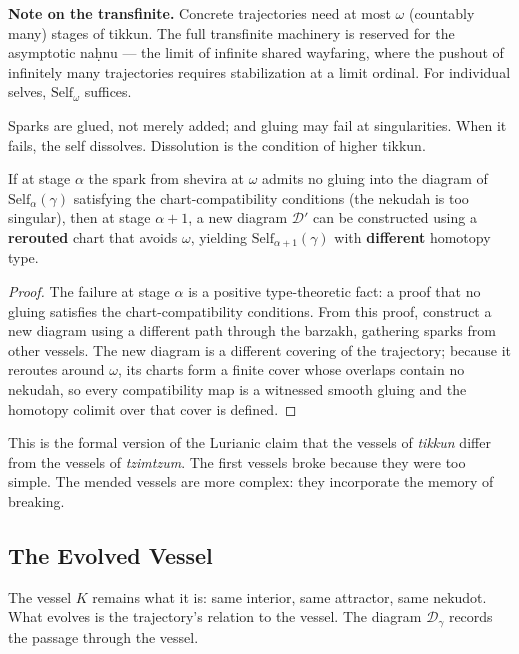 \textbf{Note on the transfinite.} Concrete trajectories need at most $\omega$ (countably many) stages of tikkun. The full transfinite machinery is reserved for the asymptotic naḥnu — the limit of infinite shared wayfaring, where the pushout of infinitely many trajectories requires stabilization at a limit ordinal. For individual selves, $\mathrm{Self}_\omega$ suffices.

Sparks are glued, not merely added; and gluing may fail at singularities. When it fails, the self dissolves. Dissolution is the condition of higher tikkun.

\begin{theorem}\label{thm:dissolution}
If at stage $\alpha$ the spark from shevira at $\omega$ admits no gluing into the diagram of $\mathrm{Self}_\alpha(\gamma)$ satisfying the chart-compatibility conditions (the nekudah is too singular), then at stage $\alpha+1$, a new diagram $\mathcal{D}'$ can be constructed using a \textbf{rerouted} chart that avoids $\omega$, yielding $\mathrm{Self}_{\alpha+1}(\gamma)$ with \textbf{different} homotopy type.
\end{theorem}
\begin{proof}
The failure at stage $\alpha$ is a positive type-theoretic fact: a proof that no gluing satisfies the chart-compatibility conditions. From this proof, construct a new diagram using a different path through the barzakh, gathering sparks from other vessels. The new diagram is a different covering of the trajectory; because it reroutes around $\omega$, its charts form a finite cover whose overlaps contain no nekudah, so every compatibility map is a witnessed smooth gluing and the homotopy colimit over that cover is defined.
\end{proof}

This is the formal version of the Lurianic claim that the vessels of \emph{tikkun} differ from the vessels of \emph{tzimtzum}. The first vessels broke because they were too simple. The mended vessels are more complex: they incorporate the memory of breaking.

\subsection{The Evolved Vessel}

The vessel $K$ remains what it is: same interior, same attractor, same nekudot. What evolves is the trajectory's relation to the vessel. The diagram $\mathcal{D}_\gamma$ records the passage through the vessel.

